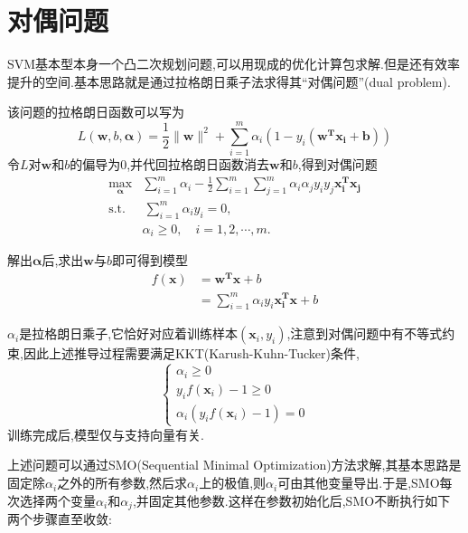 \section{对偶问题}

SVM基本型本身一个凸二次规划问题,可以用现成的优化计算包求解.但是还有效率提升的空间.基本思路就是通过拉格朗日乘子法求得其``对偶问题''(dual problem).

该问题的拉格朗日函数可以写为
\begin{equation}L(\mathbf w, b, \mathbf\alpha)=\frac{1}{2}\|\mathbf w\|^2+\sum_{i=1}^m\alpha_i(1-y_i(\mathbf{w^Tx_i+b}))\end{equation}
令$L$对$\mathbf w$和$b$的偏导为$0$,并代回拉格朗日函数消去$\mathbf w$和$b$,得到对偶问题
\begin{equation}\begin{split}
\max_{\mathbf\alpha}&\sum_{i=1}^m\alpha_i-\frac{1}{2}\sum_{i=1}^m\sum_{j=1}^m\alpha_i\alpha_jy_iy_j\mathbf{x_i^Tx_j}\\
\text{s.t.}&\,\sum_{i=1}^m\alpha_iy_i=0,\\
&\alpha_i\ge 0,\quad i=1,2,\cdots,m.
\end{split}\end{equation}

解出$\mathbf\alpha$后,求出$\mathbf w$与$b$即可得到模型
\begin{equation}\begin{split}
f(\mathbf x)&=\mathbf{w^Tx}+b\\
&=\sum_{i=1}^m\alpha_iy_i\mathbf{x_i^Tx}+b
\end{split}\end{equation}

$\alpha_i$是拉格朗日乘子,它恰好对应着训练样本$(\mathbf x_i,y_i)$,注意到对偶问题中有不等式约束,因此上述推导过程需要满足KKT(Karush-Kuhn-Tucker)条件,
\begin{equation}\left\{\begin{array}{ll}
\alpha_i\ge 0\\
y_if(\mathbf x_i)-1\ge 0\\
\alpha_i(y_if(\mathbf x_i)-1)=0
\end{array}\right.\end{equation}
训练完成后,模型仅与支持向量有关.

上述问题可以通过SMO(Sequential Minimal Optimization)方法求解,其基本思路是固定除$\alpha_i$之外的所有参数,然后求$\alpha_i$上的极值,则$\alpha_i$可由其他变量导出.于是,SMO每次选择两个变量$\alpha_i$和$\alpha_j$,并固定其他参数.这样在参数初始化后,SMO不断执行如下两个步骤直至收敛:

